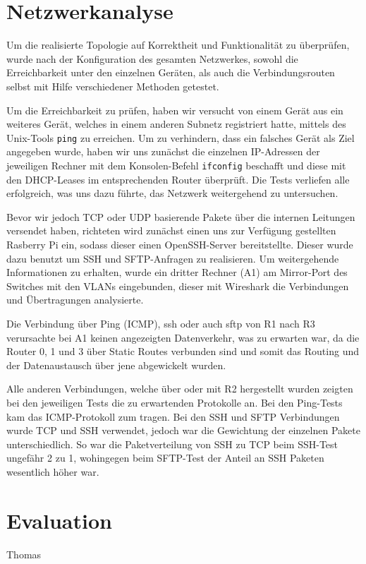 \documentclass[10pt,a4paper]{article}
\begin{document}
\section{Netzwerkanalyse}
Um die realisierte Topologie auf Korrektheit und Funktionalität zu
überprüfen, wurde nach der Konfiguration des gesamten Netzwerkes,
sowohl die Erreichbarkeit unter den einzelnen Geräten, als auch die
Verbindungsrouten selbst mit Hilfe verschiedener Methoden getestet.
\par
Um die Erreichbarkeit zu prüfen, haben wir versucht von einem Gerät
aus ein weiteres Gerät, welches in einem anderen Subnetz registriert
hatte, mittels des Unix-Tools \texttt{ping} zu erreichen. Um zu
verhindern, dass ein falsches Gerät als Ziel angegeben wurde, haben
wir uns zunächst die einzelnen IP-Adressen der jeweiligen Rechner mit
dem Konsolen-Befehl \texttt{ifconfig} beschafft und diese mit den
DHCP-Leases im entsprechenden Router überprüft. Die Tests verliefen
alle erfolgreich, was uns dazu führte, das Netzwerk weitergehend zu
untersuchen.
\par 
Bevor wir jedoch TCP oder UDP basierende Pakete über die internen
Leitungen versendet haben, richteten wird zunächst einen uns zur
Verfügung gestellten Rasberry Pi ein, sodass dieser einen
OpenSSH-Server bereitstellte. Dieser wurde dazu benutzt um SSH und
SFTP-Anfragen zu realisieren. Um weitergehende Informationen zu
erhalten, wurde ein dritter Rechner (A1) am Mirror-Port des Switches
mit den VLANs eingebunden, dieser mit Wireshark die Verbindungen und
Übertragungen analysierte.
\par
Die Verbindung über Ping (ICMP), ssh oder auch sftp von R1 nach R3
verursachte bei A1 keinen angezeigten Datenverkehr, was zu erwarten
war, da die Router 0, 1 und 3 über Static Routes verbunden sind und
somit das Routing und der Datenaustausch über jene abgewickelt wurden.
\par
Alle anderen Verbindungen, welche über oder mit R2 hergestellt wurden
zeigten bei den jeweiligen Tests die zu erwartenden Protokolle an. Bei
den Ping-Tests kam das ICMP-Protokoll zum tragen. Bei den SSH und SFTP
Verbindungen wurde TCP und SSH verwendet, jedoch war die Gewichtung
der einzelnen Pakete unterschiedlich. So war die Paketverteilung von
SSH zu TCP beim SSH-Test ungefähr 2 zu 1, wohingegen beim SFTP-Test
der Anteil an SSH Paketen wesentlich höher war.


\section{Evaluation}Thomas
\end{document}
